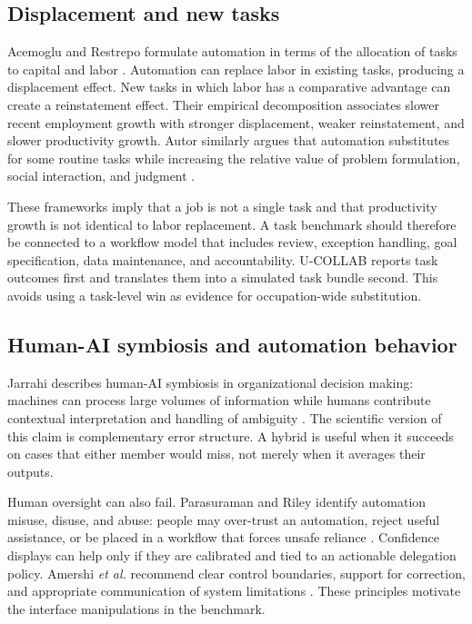 \documentclass[conference]{IEEEtran}
\begin{document}
\subsection{Displacement and new tasks}

Acemoglu and Restrepo formulate automation in terms of the allocation of tasks to capital and labor \cite{acemoglu2019}. Automation can replace labor in existing tasks, producing a displacement effect. New tasks in which labor has a comparative advantage can create a reinstatement effect. Their empirical decomposition associates slower recent employment growth with stronger displacement, weaker reinstatement, and slower productivity growth. Autor similarly argues that automation substitutes for some routine tasks while increasing the relative value of problem formulation, social interaction, and judgment \cite{autor2015}.

These frameworks imply that a job is not a single task and that productivity growth is not identical to labor replacement. A task benchmark should therefore be connected to a workflow model that includes review, exception handling, goal specification, data maintenance, and accountability. U-COLLAB reports task outcomes first and translates them into a simulated task bundle second. This avoids using a task-level win as evidence for occupation-wide substitution.

\subsection{Human-AI symbiosis and automation behavior}

Jarrahi describes human-AI symbiosis in organizational decision making: machines can process large volumes of information while humans contribute contextual interpretation and handling of ambiguity \cite{jarrahi2018}. The scientific version of this claim is complementary error structure. A hybrid is useful when it succeeds on cases that either member would miss, not merely when it averages their outputs.

Human oversight can also fail. Parasuraman and Riley identify automation misuse, disuse, and abuse: people may over-trust an automation, reject useful assistance, or be placed in a workflow that forces unsafe reliance \cite{parasuraman1997}. Confidence displays can help only if they are calibrated and tied to an actionable delegation policy. Amershi \emph{et al.} recommend clear control boundaries, support for correction, and appropriate communication of system limitations \cite{amershi2019}. These principles motivate the interface manipulations in the benchmark.
\end{document}
